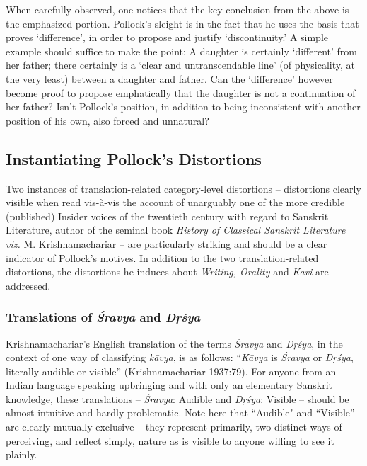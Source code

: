 \vskip 4pt

When carefully observed, one notices that the key conclusion from the above is the emphasized portion. Pollock’s sleight is in the fact that he uses the basis that proves ‘difference’, in order to propose and justify ‘discontinuity.’ A simple example should suffice to make the point: A daughter is certainly ‘different’ from her father; there certainly is a ‘clear and untranscendable line’ (of physicality, at the very least) between a daughter and father. Can the ‘difference’ however become proof to propose emphatically that the daughter is not a continuation of her father? Isn’t Pollock’s position, in addition to being inconsistent with another position of his own, also forced and unnatural?


\subsection{Instantiating Pollock’s Distortions}

Two instances of translation-related category-level distortions – distortions clearly visible when read vis-à-vis the account of unarguably one of the more credible (published) Insider voices of the twentieth century with regard to Sanskrit Literature, author of the seminal book \textit{History of Classical Sanskrit Literature viz.} M. Krishnamachariar – are particularly striking and should be a clear indicator of Pollock’s motives. In addition to the two translation-related distortions, the distortions he induces about \textit{Writing, Orality} and \textit{Kavi} are addressed.

\vspace{-.4cm}

\subsubsection{Translations of \textit{Śravya} and \textit{Dṛśya}}

Krishnamachariar’s English translation of the terms \textit{Śravya} and \textit{Dṛśya}, in the context of one way of classifying \textit{kāvya}, is as follows: “\textit{Kāvya} is \textit{Śravya} or \textit{Dṛśya}, literally audible or visible” (Krishnamachariar 1937:79). For anyone from an Indian language speaking upbringing and with only an elementary Sanskrit knowledge, these translations – \textit{Śravya}: Audible and \textit{Dṛśya}: Visible – should be almost intuitive and hardly problematic. Note here that “Audible" and “Visible” are clearly mutually exclusive – they represent primarily, two distinct ways of perceiving, and reflect simply, nature as is visible to anyone willing to see it plainly.

